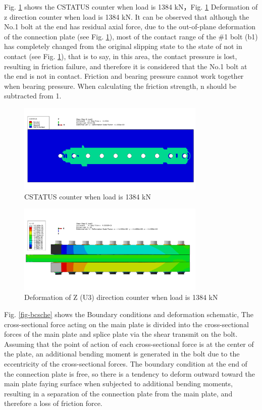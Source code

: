 Fig. \ref{fig-cstavfst} shows the CSTATUS counter when load is 1384 kN，Fig. \ref{fig-cstavfst} Deformation of z direction counter when load is 1384 kN.
It can be observed that although the No.1 bolt at the end has residual axial force, due to the out-of-plane deformation of the connection plate (see Fig. \ref{fig-cstavfst}), most of the contact range of the \#1 bolt (b1) has completely changed from the original slipping state to the state of not in contact (see Fig. \ref{fig-cstavfst}), that is to say, in this area, the contact pressure is lost, resulting in friction failure, and therefore it is considered that the No.1 bolt at the end is not in contact. Friction and bearing pressure cannot work together when bearing pressure. When calculating the friction strength, n should be subtracted from 1.

\begin{figure}[htbp]
    \centering
    \includegraphics[width=0.8\textwidth]{imgs/ch7/cstatus-vfst.png}
    \caption{CSTATUS counter when load is 1384 kN}
    \label{fig-cstavfst}
\end{figure}

\begin{figure}[htbp]
    \centering
    \includegraphics[width=0.8\textwidth]{imgs/ch7/U3-vfst.png}
    \caption{Deformation of Z (U3) direction counter when load is 1384 kN}
    \label{fig-u3vfst}
\end{figure}


Fig. \ref{fig-bcsche} shows the Boundary conditions and deformation schematic, The cross-sectional force acting on the main plate is divided into the cross-sectional forces of the main plate and splice plate via the shear transmit on the bolt. Assuming that the point of action of each cross-sectional force is at the center of the plate, an additional bending moment is generated in the bolt due to the eccentricity of the cross-sectional forces. The boundary condition at the end of the connection plate is free, so there is a tendency to deform outward toward the main plate faying surface when subjected to additional bending moments, resulting in a separation of the connection plate from the main plate, and therefore a loss of friction force.


